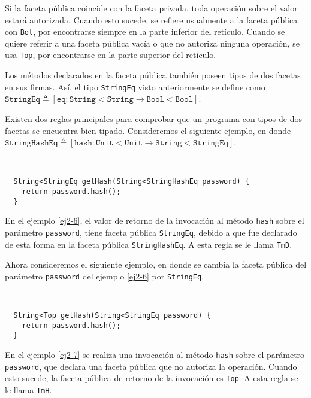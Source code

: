 Si la faceta pública coincide con la faceta privada, toda operación sobre el valor estará autorizada. Cuando esto sucede, se refiere usualmente a la faceta pública con \texttt{Bot}, por encontrarse siempre en la parte inferior del retículo. Cuando se quiere referir a una faceta pública vacía o que no autoriza ninguna operación, se usa \texttt{Top}, por encontrarse en la parte superior del retículo.

Los métodos declarados en la faceta pública también poseen tipos de dos facetas en sus firmas. Así, el tipo \texttt{StringEq} visto anteriormente se define como $\mathtt{StringEq} \triangleq [\mathtt{eq} : \mathtt{String<String} \rightarrow \mathtt{Bool<Bool}]$.

Existen dos reglas principales para comprobar que un programa con tipos de dos facetas se encuentra bien tipado. Consideremos el siguiente ejemplo, en donde $\mathtt{StringHashEq} \triangleq [\mathtt{hash} : \mathtt{Unit<Unit} \rightarrow \mathtt{String<StringEq}]$.

\begin{ej} \ \\
  \normalfont
  \label{ej2-6}
\begin{lstlisting}
  String<StringEq getHash(String<StringHashEq password) {
  	return password.hash();
  }
\end{lstlisting}
\end{ej}

En el ejemplo \ref{ej2-6}, el valor de retorno de la invocación al método \texttt{hash} sobre el parámetro \texttt{password}, tiene faceta pública \texttt{StringEq}, debido a que fue declarado de esta forma en la faceta pública \texttt{StringHashEq}. A esta regla se le llama \texttt{TmD}.

Ahora consideremos el siguiente ejemplo, en donde se cambia la faceta pública del parámetro \texttt{password} del ejemplo \ref{ej2-6} por \texttt{StringEq}.
\clearpage
\begin{ej} \ \\
  \normalfont
  \label{ej2-7}
\begin{lstlisting}
  String<Top getHash(String<StringEq password) {
  	return password.hash();
  }
\end{lstlisting}
\end{ej}

En el ejemplo \ref{ej2-7} se realiza una invocación al método \texttt{hash} sobre el parámetro \texttt{password}, que declara una faceta pública que no autoriza la operación. Cuando esto sucede, la faceta pública de retorno de la invocación es \texttt{Top}. A esta regla se le llama \texttt{TmH}.

